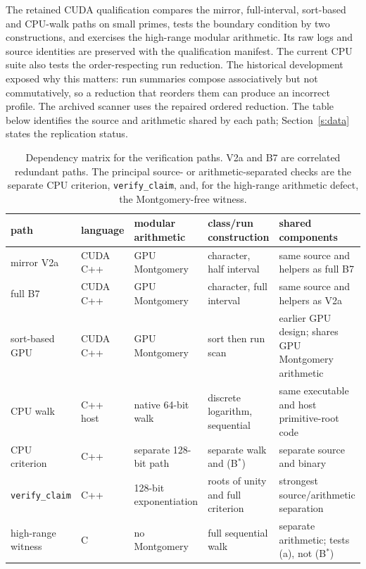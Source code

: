 The retained CUDA qualification compares the mirror, full-interval,
sort-based and CPU-walk paths on small primes, tests the boundary condition
by two constructions, and exercises the high-range modular arithmetic.
Its raw logs and source identities are preserved with the qualification
manifest. The current CPU suite also tests the order-respecting run reduction.
The historical development exposed why this matters: run summaries compose
associatively but not commutatively, so a reduction that reorders them can
produce an incorrect profile. The archived scanner uses the repaired
ordered reduction. The table below identifies the source and arithmetic
shared by each path; Section~\ref{s:data} states the replication status.
\begin{table}[ht]
\centering\scriptsize
\begin{tabular}{P{2.3cm} P{1.7cm} P{2.4cm} P{2.4cm} P{3.0cm}}
\toprule
path & language & modular arithmetic & class/run construction & shared components \\
\midrule
mirror V2a & CUDA C++ & GPU Montgomery & character, half interval & same source and helpers as full B7 \\
full B7 & CUDA C++ & GPU Montgomery & character, full interval & same source and helpers as V2a \\
sort-based GPU & CUDA C++ & GPU Montgomery & sort then run scan & earlier GPU design; shares GPU Montgomery arithmetic \\
CPU walk & C++ host & native 64-bit walk & discrete logarithm, sequential & same executable and host primitive-root code \\
CPU criterion & C++ & separate 128-bit path & separate walk and (B$^*$) & separate source and binary \\
\texttt{verify\_claim} & C++ & 128-bit exponentiation & roots of unity and full criterion & strongest source/arithmetic separation \\
high-range witness & C & no Montgomery & full sequential walk & separate arithmetic; tests (a), not (B$^*$) \\
\bottomrule
\end{tabular}
\caption{Dependency matrix for the verification paths.  V2a and B7 are
correlated redundant paths.  The principal source- or arithmetic-separated
checks are the separate CPU criterion, \texttt{verify\_claim}, and, for the
high-range arithmetic defect, the Montgomery-free witness.}
\label{tab:dependencies}
\end{table}

